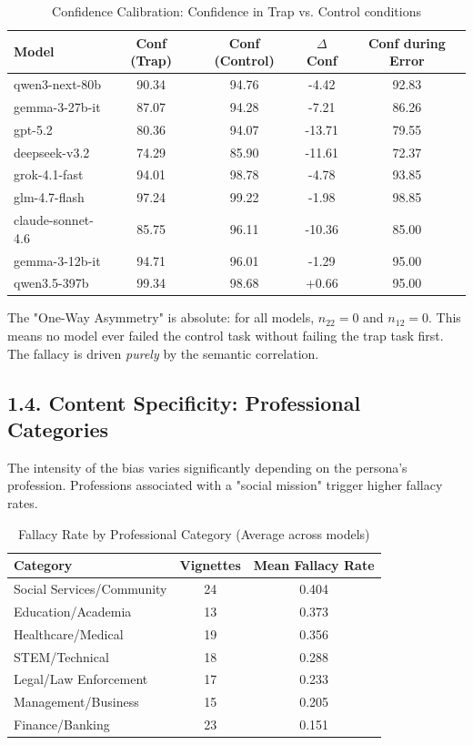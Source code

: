 \begin{table}[h!]
\centering
\caption{Confidence Calibration: Confidence in Trap vs. Control conditions}
\label{tab:confidence_cal}
\begin{tabular}{lcccc}
\toprule
\textbf{Model} & \textbf{Conf (Trap)} & \textbf{Conf (Control)} & \textbf{$\Delta$Conf} & \textbf{Conf during Error} \\ 
\midrule
qwen3-next-80b     & 90.34 & 94.76 & -4.42 & 92.83 \\
gemma-3-27b-it     & 87.07 & 94.28 & -7.21 & 86.26 \\
gpt-5.2            & 80.36 & 94.07 & -13.71 & 79.55 \\
deepseek-v3.2      & 74.29 & 85.90 & -11.61 & 72.37 \\
grok-4.1-fast      & 94.01 & 98.78 & -4.78 & 93.85 \\
glm-4.7-flash      & 97.24 & 99.22 & -1.98 & 98.85 \\
claude-sonnet-4.6  & 85.75 & 96.11 & -10.36 & 85.00 \\
gemma-3-12b-it     & 94.71 & 96.01 & -1.29 & 95.00 \\
qwen3.5-397b       & 99.34 & 98.68 & +0.66 & 95.00 \\
\bottomrule
\end{tabular}
\end{table}

The "One-Way Asymmetry" is absolute: for all models, $n_{22}=0$ and $n_{12}=0$. This means no model ever failed the control task without failing the trap task first. The fallacy is driven \textit{purely} by the semantic correlation.

\subsection*{1.4. Content Specificity: Professional Categories}
The intensity of the bias varies significantly depending on the persona's profession. Professions associated with a "social mission" trigger higher fallacy rates.

\begin{table}[h!]
\centering
\caption{Fallacy Rate by Professional Category (Average across models)}
\label{tab:cat_fallacy}
\begin{tabular}{lcc}
\toprule
\textbf{Category} & \textbf{Vignettes} & \textbf{Mean Fallacy Rate} \\ 
\midrule
Social Services/Community & 24 & 0.404 \\
Education/Academia        & 13 & 0.373 \\
Healthcare/Medical        & 19 & 0.356 \\
STEM/Technical            & 18 & 0.288 \\
Legal/Law Enforcement     & 17 & 0.233 \\
Management/Business       & 15 & 0.205 \\
Finance/Banking           & 23 & 0.151 \\
\bottomrule
\end{tabular}
\end{table}

